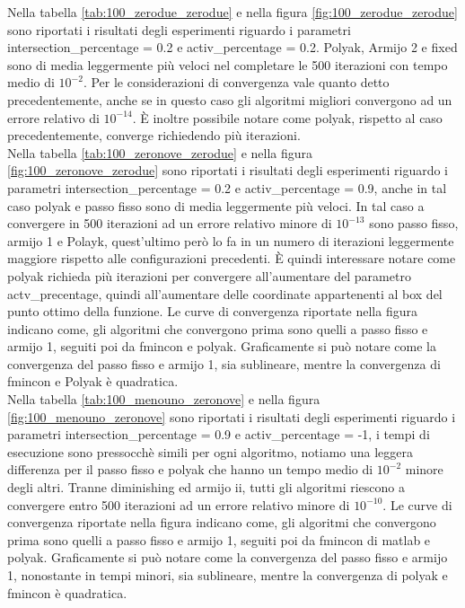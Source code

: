 \documentclass[12pt]{extarticle}
\begin{document}
Nella tabella \ref{tab:100_zerodue_zerodue} e nella figura \ref{fig:100_zerodue_zerodue} sono riportati i risultati degli esperimenti riguardo i parametri intersection\_percentage = 0.2 e activ\_percentage = 0.2. Polyak, Armijo 2 e fixed sono di media leggermente più veloci nel completare le 500 iterazioni con tempo medio di $10^{-2}$. Per le considerazioni di convergenza vale quanto detto precedentemente, anche se in questo caso gli algoritmi migliori convergono ad un errore relativo di $10^{-14}$. È inoltre possibile notare come polyak, rispetto al caso precedentemente, converge richiedendo più iterazioni.\\
Nella tabella \ref{tab:100_zeronove_zerodue}  e nella figura \ref{fig:100_zeronove_zerodue} sono riportati i risultati degli esperimenti riguardo i parametri intersection\_percentage = 0.2 e activ\_percentage = 0.9, anche in tal caso polyak e passo fisso sono di media leggermente più veloci. In tal caso a convergere in 500 iterazioni ad un errore relativo minore di $10^{-13}$ sono passo fisso, armijo 1 e Polayk, quest'ultimo però lo fa in un numero di iterazioni leggermente maggiore rispetto alle configurazioni precedenti. È quindi interessare notare come polyak richieda più iterazioni per convergere all'aumentare del parametro actv\_precentage, quindi all'aumentare delle coordinate appartenenti al box del punto ottimo della funzione. Le curve di convergenza riportate nella figura indicano come, gli algoritmi che convergono prima sono quelli a passo fisso e armijo 1, seguiti poi da fmincon e polyak. Graficamente si può notare come la convergenza del passo fisso e armijo 1, sia sublineare, mentre la convergenza di fmincon e Polyak è quadratica.\\
Nella tabella \ref{tab:100_menouno_zeronove} e nella figura \ref{fig:100_menouno_zeronove} sono riportati i risultati degli esperimenti riguardo i parametri intersection\_percentage = 0.9 e activ\_percentage = -1, i tempi di esecuzione sono pressocchè simili per ogni algoritmo, notiamo una leggera differenza per il passo fisso e polyak che hanno un tempo medio di $10^{-2}$ minore degli altri. Tranne diminishing ed armijo ii, tutti gli algoritmi riescono a convergere entro 500 iterazioni ad un errore relativo minore di $10^{-10}$. Le curve di convergenza riportate nella figura indicano come, gli algoritmi che convergono prima sono quelli a passo fisso e armijo 1, seguiti poi da fmincon di matlab e polyak. Graficamente si può notare come la convergenza del passo fisso e armijo 1, nonostante in tempi minori, sia sublineare, mentre la convergenza di polyak e fmincon è quadratica.\\
\end{document}
